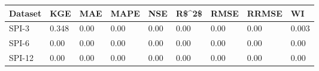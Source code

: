 \begin{tabular}{lllllllll}
\toprule
Dataset &   KGE &  MAE & MAPE &  NSE & R\$\textasciicircum 2\$ & RMSE & RRMSE &    WI \\
\midrule
  SPI-3 & 0.348 & 0.00 & 0.00 & 0.00 &  0.00 & 0.00 &  0.00 & 0.003 \\
  SPI-6 &  0.00 & 0.00 & 0.00 & 0.00 &  0.00 & 0.00 &  0.00 &  0.00 \\
 SPI-12 &  0.00 & 0.00 & 0.00 & 0.00 &  0.00 & 0.00 &  0.00 &  0.00 \\
\bottomrule
\end{tabular}
